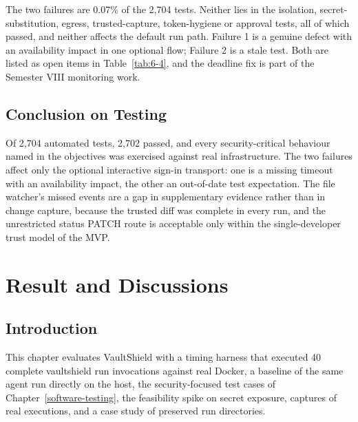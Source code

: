 \documentclass[12pt,a4paper,oneside]{report}
\begin{document}
The two failures are 0.07\% of the 2,704 tests. Neither lies in the isolation, secret-substitution, egress, trusted-capture, token-hygiene or approval tests, all of which passed, and neither affects the default run path. Failure 1 is a genuine defect with an availability impact in one optional flow; Failure 2 is a stale test. Both are listed as open items in Table~\ref{tab:6-4}, and the deadline fix is part of the Semester VIII monitoring work.

\section{Conclusion on Testing}\label{conclusion-on-testing}

Of 2,704 automated tests, 2,702 passed, and every security-critical behaviour named in the objectives was exercised against real infrastructure. The two failures affect only the optional interactive sign-in transport: one is a missing timeout with an availability impact, the other an out-of-date test expectation. The file watcher's missed events are a gap in supplementary evidence rather than in change capture, because the trusted diff was complete in every run, and the unrestricted status PATCH route is acceptable only within the single-developer trust model of the MVP.

\clearpage

\chapter{Result and Discussions}\label{results-and-analysis}

\section{Introduction}\label{introduction-1}

This chapter evaluates VaultShield with a timing harness that executed 40 complete vaultshield run invocations against real Docker, a baseline of the same agent run directly on the host, the security-focused test cases of Chapter~\ref{software-testing}, the feasibility spike on secret exposure, captures of real executions, and a case study of preserved run directories.

\medskip\noindent{}
\medskip
\end{document}
